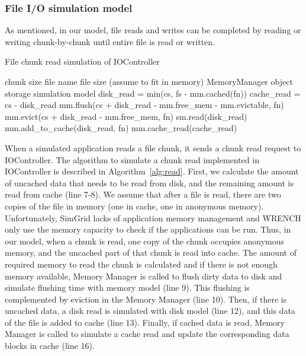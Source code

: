 \documentclass[conference]{IEEEtran}
\newcommand{\Desc}[2]{\State \makebox[2em][l]{#1}#2}
\begin{document}
			\subsubsection{File I/O simulation model}
			 
			As mentioned, in our model, file reads and writes can be completed by 
			reading or writing chunk-by-chunk until entire file is read or written.
			
			\begin{algorithm}\caption{File chunk read simulation of IOController}
			\label{alg:read}
				\small
				\begin{algorithmic}[1]
					\Input
        				\Desc{cs}{chunk size}
        				\Desc{fn}{file name}
        				\Desc{fs}{file size (assume to fit in memory)}
						\Desc{mm}{MemoryManager object}
						\Desc{sm}{storage simulation model}
   					\EndInput
   					\State disk\_read = min(cs, fs - mm.cached(fn))
   					\State cache\_read = cs - disk\_read
					\State mm.flush(cs + disk\_read - mm.free\_mem - mm.evictable, fn) 
					\State mm.evict(cs + disk\_read - mm.free\_mem, fn) 
					  	
						\State sm.read(disk\_read)  
						\State mm.add\_to\_cache(disk\_read, fn) 	
					\EndIf
					 
						\State mm.cache\_read(cache\_read)  
					\EndIf
				\end{algorithmic}
			\end{algorithm}			

			When a simulated application reads a file chunk, it sends a chunk read request 
			to IOController. 			
			The algorithm to simulate a chunk read implemented in IOController 
			is described in Algorithm~\ref{alg:read}.   
			First, we calculate the amount of uncached data that needs to be read 
			from disk, and the remaining amount is read from cache (line 7-8).
			We assume that after a file is read, there are two copies of the file in memory 
			(one in cache, one in anonymous memory). 
			Unfortunately, SimGrid lacks of application memory management and WRENCH 
			only use the memory capacity to check if the applications can be run. 
			Thus, in our model, when a chunk is read, one copy of the chunk 
			occupies anonymous memory, and the uncached part of that chunk is 
			read into cache.	
			The amount of required memory to read the chunk is calculated and 
			if there is not enough memory available, Memory Manager is called to 
			flush dirty data to disk and simulate flushing time with memory model (line 9). 
			This flushing is complemented by eviction in the Memory Manager (line 10). 
			Then, if there is uncached data, a disk read is simulated with disk model (line 12), 
			and this data of the file is added to cache (line 13).
			Finally, if cached data is read, Memory Manager is called to simulate a cache read  
			and update the corresponding data blocks in cache (line 16).
\end{document}
